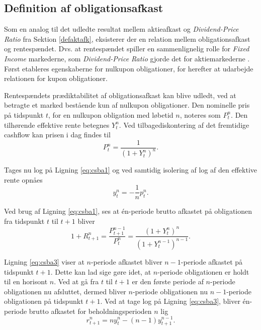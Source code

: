 \documentclass[
  a4paper,
  oneside]{memoir}
\begin{document}
\hypertarget{defafobl}{%
\subsection{Definition af obligationsafkast}\label{defafobl}}

Som en analog til det udledte resultat mellem aktieafkast og \emph{Dividend-Price Ratio} fra Sektion \ref{defaktafk}, eksisterer der en relation mellem obligationsafkast og rentespændet. Dvs. at rentespændet spiller en sammenlignelig rolle for \emph{Fixed Income} markederne, som \emph{Dividend-Price Ratio} gjorde det for aktiemarkederne \citep{Campbell1997}. Først etableres egenskaberne for nulkupon obligationer, for herefter at udarbejde relationen for kupon obligationer.

Rentespændets prædiktabilitet af obligationsafkast kan blive udledt, ved at betragte et marked bestående kun af nulkupon obligationer. Den nominelle pris på tidspunkt \(t\), for en nulkupon obligation med løbetid \(n\), noteres som \(P_t^n\). Den tilhørende effektive rente betegnes \(Y_t^n\). Ved tilbagediskontering af det fremtidige cashflow kan prisen i dag findes til
\begin{equation}
P_t^n=\frac{1}{(1+Y_t^n)^n}. \label{eq:csba1}
\end{equation}

Tages nu log på Ligning \eqref{eq:csba1} og ved samtidig isolering af log af den effektive rente opnåes
\begin{equation}
y_t^n=-\frac{1}{n}p_t^n. \label{eq:csba2}
\end{equation}

Ved brug af Ligning \eqref{eq:csba1}, ses at én-periode brutto afkastet på obligationen fra tidspunkt \(t\) til \(t+1\) bliver
\begin{equation}
1+R_{t+1}^n=\frac{P_{t+1}^{n-1}}{P_t^n}=\frac{(1+Y_t^n)^n}{(1+Y_t^{n-1})^{n-1}}. \label{eq:csba3}
\end{equation}

Ligning \eqref{eq:csba3} viser at \(n\)-periode afkastet bliver \(n-1\)-periode afkastet på tidspunkt \(t+1\). Dette kan lad sige gøre idet, at \(n\)-periode obligationen er holdt til en horisont \(n\). Ved at gå fra \(t\) til \(t+1\) er den første periode af \(n\)-periode obligationen nu afsluttet, dermed bliver \(n\)-periode obligationen nu \(n-1\)-periode obligationen på tidspunkt \(t+1\). Ved at tage log på Ligning \eqref{eq:csba3}, bliver én-periode brutto afkastet for beholdningsperioden \(n\) lig
\begin{equation}
r_{t+1}^n=n y_t^n - (n-1) y_{t+1}^{n-1}. \label{eq:csba4}
\end{equation}
\end{document}
